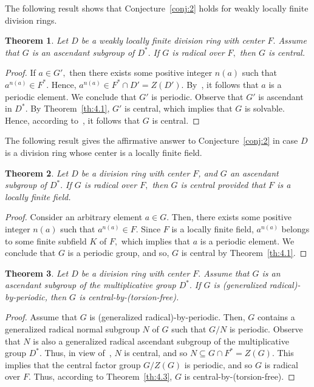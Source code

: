 \documentclass{amsart}
\newtheorem{theorem}{Theorem}[section]
\theoremstyle{definition}
\begin{document}
The following result shows that Conjecture~\ref{conj:2}  holds for weakly locally finite division rings.
\begin{theorem}\label{th:4.4} Let $D$ be a weakly locally finite division ring with center $F.$ Assume that $G$ is an ascendant subgroup of $D^*.$ If $G$ is radical over $F,$ then $G$ is central.
\end{theorem}
\begin{proof} If $a\in G',$ then there exists some positive integer $n(a)$ such that $a^{n(a)}\in F^*.$ Hence, $a^{n(a)}\in F^*\cap D'=Z(D').$ By~\cite[Lemma 7]{Pa_dbh_2019}, it follows that $a$ is a periodic element. We conclude that $G'$ is periodic. Observe that $G'$ is ascendant in $D^*.$ By Theorem~\ref{th:4.1}, $G'$ is central, which implies that $G$ is solvable. Hence, according to~\cite[Theorem 3.8]{Pa_ChuaHai_2026}, it follows that $G$ is central. 
\end{proof}
The following result gives the affirmative answer to Conjecture~\ref{conj:2} in case $D$ is a division ring whose center is a locally finite field.
\begin{theorem}\label{th:4.5} Let $D$ be a division ring with center $F$, and $G$ an ascendant subgroup of $D^*.$ If $G$ is radical over $F,$ then $G$ is central provided that $F$ is a locally finite field.
\end{theorem}
\begin{proof} Consider an arbitrary element $a\in G$. Then, there exists some positive integer $n(a)$ such that $a^{n(a)}\in F.$ Since $F$ is a locally finite field, $a^{n(a)}$ belongs to some finite subfield $K$ of $F,$ which implies that $a$ is a periodic element. We conclude that $G$ is a periodic group, and so, $G$ is central by Theorem~\ref{th:4.1}.
\end{proof}
\begin{theorem}\label{th:4.6} Let $D$ be a division ring with center $F.$ Assume that $G$ is an ascendant subgroup of the multiplicative group $D^*.$ If $G$ is (generalized radical)-by-periodic, then $G$ is central-by-(torsion-free).
\end{theorem}
\begin{proof} Assume that $G$ is (generalized radical)-by-periodic. Then, $G$ contains a generalized radical normal subgroup $N$ of $G$ such that $G/N$ is periodic. Observe that $N$ is also a generalized radical ascendant subgroup of the multiplicative group $D^*.$ Thus, in view of~\cite[Theorem 3.8]{Pa_HaiChua_2025}, $N$ is central, and so $N\subseteq G\cap F^*=Z(G).$ This implies that the central factor group $G/Z(G)$ is periodic, and so $G$ is radical over $F.$ Thus, according to Theorem~\ref{th:4.3}, $G$ is central-by-(torsion-free).
\end{proof}
\end{document}
